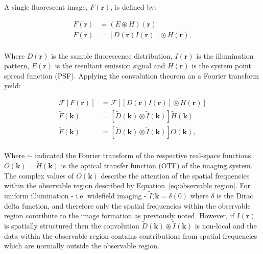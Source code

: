 A single fluorescent image, $F(\textbf{r})$, is defined by:

\begin{equation}\label{eq:fluorescent_image}
\begin{split}
F(\textbf{r}) &= (E \circledast H)(\textbf{r})\\
F(\textbf{r}) &= [D(\textbf{r})I(\textbf{r})] \circledast H(\textbf{r}),\\
\end{split}
\end{equation}

Where $D(\textbf{r})$ is the sample fluorescence distribution, $I(\textbf{r})$ 
is the illumination pattern, $E(\textbf{r})$ is the resultant emission signal 
and $H(\textbf{r})$ is the system point spread function (PSF). Applying the 
convolution theorem an a Fourier transform yeild:

\begin{equation}\label{eq:SIM_fluorescent_image_fourier}
\begin{split}
\mathcal{F}\left[F(\textbf{r})\right] &= \mathcal{F}\left[\left[D(\textbf{r})I(\textbf{r})\right] \circledast H(\textbf{r})\right]\\
\tilde{F}(\textbf{k}) &= \left[\tilde{D}(\textbf{k})\circledast \tilde{I}(\textbf{k})\right] \tilde{H}(\textbf{k})\\
\tilde{F}(\textbf{k}) &= \left[\tilde{D}(\textbf{k})\circledast \tilde{I}(\textbf{k})\right] O(\textbf{k}),\\
\end{split}
\end{equation}

Where $\sim$ indicated the Fourier transform of the respective real-space
functions. $O(\textbf{k}) = \tilde{H}(\textbf{k})$ is the optical transfer
function (OTF) of the imaging system. The complex values of $O(\textbf{k})$
describe the attention of the spatial frequencies within the observable region
described by Equation~\ref{eq:observable region}. For uniform illumination -
i.e. widefield imaging - $\tilde{I}(\textbf{k} = \delta(0)$ where $\delta$ is
the Dirac delta function, and therefore only the spatial frequencies within the
observable region contribute to the image formation as previously noted. 
However, if $I(\textbf{r})$ is spatially structured then the convolution
$\tilde{D}(\textbf{k})\circledast \tilde{I}(\textbf{k})$ is non-local and the 
data within the observable region contains contributions from spatial 
frequencies which are normally outside the observable region.

